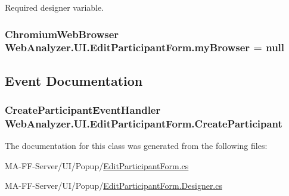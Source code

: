Required designer variable. 

\hypertarget{class_web_analyzer_1_1_u_i_1_1_edit_participant_form_a6d84e654a3d464fcd61e2b6c4f96956e}{}
\subsubsection[{my\+Browser}]{\setlength{\rightskip}{0pt plus 5cm}Chromium\+Web\+Browser Web\+Analyzer.\+U\+I.\+Edit\+Participant\+Form.\+my\+Browser = null\hspace{0.3cm}{\ttfamily [private]}}\label{class_web_analyzer_1_1_u_i_1_1_edit_participant_form_a6d84e654a3d464fcd61e2b6c4f96956e}


\subsection{Event Documentation}
\hypertarget{class_web_analyzer_1_1_u_i_1_1_edit_participant_form_a3c5b726a8fd6993ccc519319a6850ce3}{}
\subsubsection[{Create\+Participant}]{\setlength{\rightskip}{0pt plus 5cm}Create\+Participant\+Event\+Handler Web\+Analyzer.\+U\+I.\+Edit\+Participant\+Form.\+Create\+Participant}\label{class_web_analyzer_1_1_u_i_1_1_edit_participant_form_a3c5b726a8fd6993ccc519319a6850ce3}


The documentation for this class was generated from the following files\+:\begin{DoxyCompactItemize}
\item 
M\+A-\/\+F\+F-\/\+Server/\+U\+I/\+Popup/\hyperlink{_edit_participant_form_8cs}{Edit\+Participant\+Form.\+cs}\item 
M\+A-\/\+F\+F-\/\+Server/\+U\+I/\+Popup/\hyperlink{_edit_participant_form_8_designer_8cs}{Edit\+Participant\+Form.\+Designer.\+cs}\end{DoxyCompactItemize}

